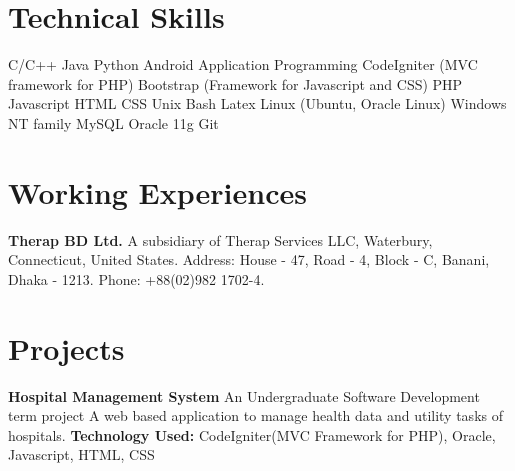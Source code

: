 \documentclass[11pt,a4paper,sans]{moderncv}
\begin{document}
\section{Technical Skills}
{
C/C++
\newline Java
\newline Python
\newline Android Application Programming 
}
{
CodeIgniter (MVC framework for PHP)
\newline Bootstrap (Framework for Javascript and CSS)
\newline PHP
\newline Javascript
\newline HTML
\newline CSS
}
{
Unix Bash
\newline Latex
}
{
Linux (Ubuntu, Oracle Linux)
\newline Windows NT family
}
{
MySQL
\newline Oracle 11g
}
{
Git
}

\section{Working Experiences}
{
\textbf{Therap BD Ltd.\newline}
A subsidiary of Therap Services LLC, Waterbury, Connecticut, United States.\newline
Address: House - 47, Road - 4, Block - C, Banani, Dhaka - 1213. \newline
Phone: +88(02)982 1702-4.
}

\section{Projects}
{
\textbf{Hospital Management System}
\newline
An Undergraduate Software Development term project \newline
A web based application to manage health data and utility tasks of hospitals.
\newline \textbf{Technology Used: } CodeIgniter(MVC Framework for PHP), Oracle, Javascript, HTML, CSS
\newline}
\end{document}

